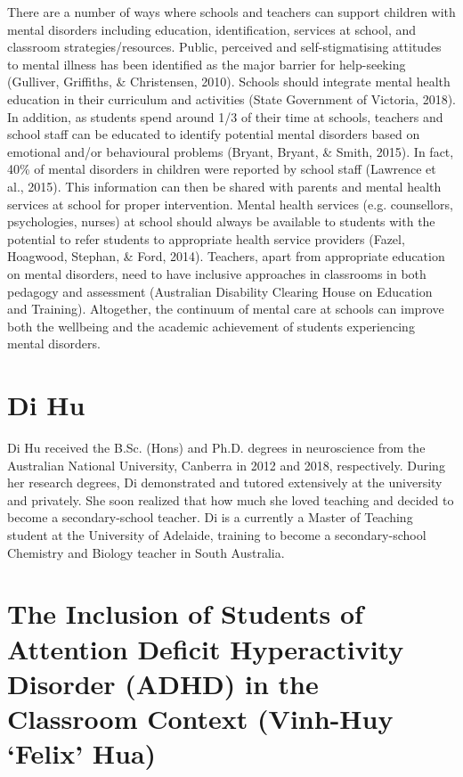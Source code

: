 \documentclass[twoside,12pt,a4paper,notitlepage]{memoir}
\begin{document}
There are a number of ways where schools and teachers can support children with mental disorders including education, identification, services at school, and classroom strategies/resources. Public, perceived and self-stigmatising attitudes to mental illness has been identified as the major barrier for help-seeking (Gulliver, Griffiths, \& Christensen, 2010). Schools should integrate mental health education in their curriculum and activities (State Government of Victoria, 2018). In addition, as students spend around 1/3 of their time at schools, teachers and school staff can be educated to identify potential mental disorders based on emotional and/or behavioural problems (Bryant, Bryant, \& Smith, 2015). In fact, 40\% of mental disorders in children were reported by school staff (Lawrence et al., 2015). This information can then be shared with parents and mental health services at school for proper intervention. Mental health services (e.g. counsellors, psychologies, nurses) at school should always be available to students with the potential to refer students to appropriate health service providers (Fazel, Hoagwood, Stephan, \& Ford, 2014). Teachers, apart from appropriate education on mental disorders, need to have inclusive approaches in classrooms in both pedagogy and assessment (Australian Disability Clearing House on Education and Training). Altogether, the continuum of mental care at schools can improve both the wellbeing and the academic achievement of students experiencing mental disorders.

\section*{Di Hu}

Di Hu received the B.Sc. (Hons) and Ph.D. degrees in neuroscience from the
Australian National University, Canberra in 2012 and 2018,
respectively. During her research degrees, Di demonstrated and tutored
extensively at the university and privately. She soon realized that how much
she loved teaching and decided to become a secondary-school teacher.
Di is a currently a Master of Teaching student at the University of Adelaide,
training to become a secondary-school Chemistry and Biology teacher in South
Australia.



\pagebreak
\section*{The Inclusion of Students of Attention Deficit Hyperactivity Disorder (ADHD) in the Classroom Context (Vinh-Huy `Felix' Hua)}
\label{aut:hua}
\end{document}
